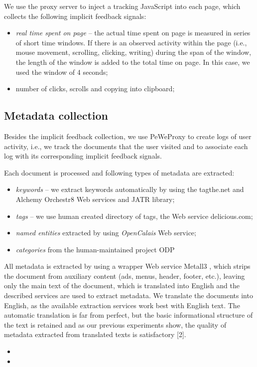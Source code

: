 \documentclass{acm_proc_article-sp} %
\begin{document}
We use the proxy server to inject a tracking JavaScript into
each page, which collects the following implicit feedback signals:

\begin{itemize} 
	\item \textit{real time spent on page} – the actual time spent on page
	is measured in series of short time windows. If there
	is an observed activity within the page (i.e., mouse
	movement, scrolling, clicking, writing) during the span
	of the window, the length of the window is added to the
	total time on page. In this case, we used the window
	of 4 seconds;
	\item number of clicks, scrolls and copying into clipboard;
\end{itemize}

\subsection{Metadata collection}

Besides the implicit feedback collection, we use PeWeProxy
to create logs of user activity, i.e., we track the documents
that the user visited and to associate each log with its corresponding
implicit feedback signals.

Each document is processed and following types of metadata
are extracted:

\begin{itemize} 
	\item \textit{keywords} – we extract keywords automatically by using
	the tagthe.net and Alchemy Orchestr8 Web services
	and JATR library;
	\item \textit{tags} – we use human created directory of tags, the Web
		service delicious.com;
	\item \textit{named entities} extracted by using \textit{OpenCalais} Web
		service;
	\item \textit{categories} from the human-maintained project ODP
\end{itemize}

All metadata is extracted by using a wrapper Web service
Metall3
, which strips the document from auxiliary content
(ads, menus, header, footer, etc.), leaving only the main text
of the document, which is translated into English and the
described services are used to extract metadata. We translate
the documents into English, as the available extraction
services work best with English text. The automatic translation
is far from perfect, but the basic informational structure
of the text is retained and as our previous experiments show,
the quality of metadata extracted from translated texts is
satisfactory [2].






\begin{itemize} 
	\item
	\item
\end{itemize}





\balancecolumns
\end{document}
